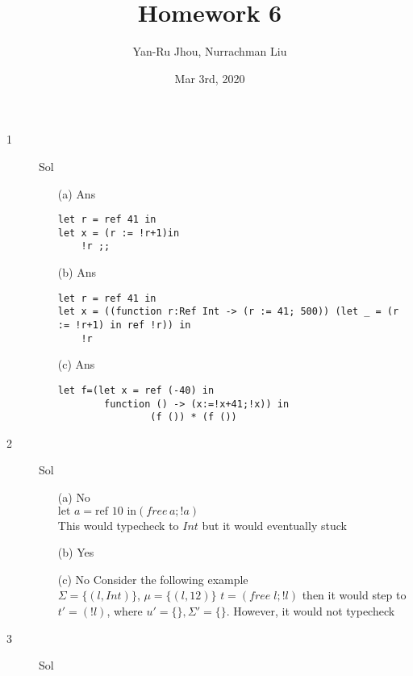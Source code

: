 \documentclass{article}
\title{Homework 6}
\author{Yan-Ru Jhou, Nurrachman Liu}
\date{Mar 3rd, 2020}
\begin{document}
    \maketitle

    \begin{description}
        \item[1]{Sol}\\
            \begin{enumerate}
                \item[(a)]{Ans}\\
                \begin{lstlisting}
let r = ref 41 in
let x = (r := !r+1)in
    !r ;;
                \end{lstlisting}
                \item[(b)]{Ans} \\
                \begin{lstlisting}
let r = ref 41 in
let x = ((function r:Ref Int -> (r := 41; 500)) (let _ = (r := !r+1) in ref !r)) in
    !r
                \end{lstlisting}
                \item[(c)]{Ans} \\
                \begin{lstlisting}
let f=(let x = ref (-40) in
        function () -> (x:=!x+41;!x)) in
                (f ()) * (f ())
                \end{lstlisting}
            \end{enumerate}
        \item [2]{Sol}
            \begin{enumerate}
                \item[(a)]{No}\\
                $\text{let } a = \text{ref } 10 \text{ in} (free\, a;!a)$ \\ This would typecheck to $Int$ but it would eventually stuck
                \item[(b)]{Yes}\\
                \item[(c)]{No} Consider the following example\\
                $\Sigma=\{(l,Int)\}$,\;  $\mu=\{(l,12)\}$\;
                $t=(free\; l;!l)$ then it would step to\\
                $t'=(!l)$, where $u'=\{\},\Sigma'=\{\}$.
                However, it would not typecheck
            \end{enumerate}
        \item[3]{Sol}

\end{description}
\end{document}
